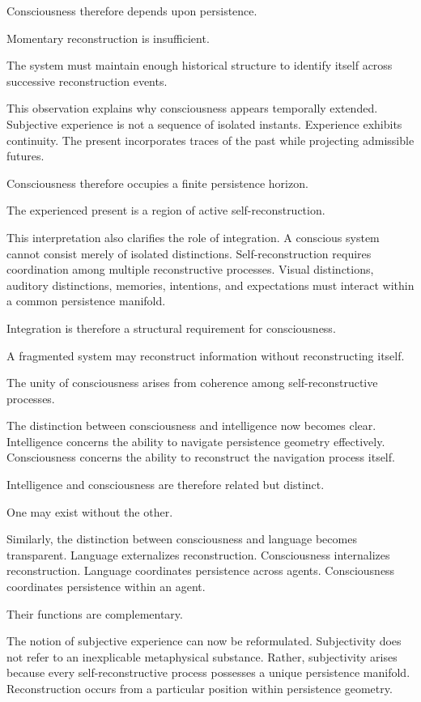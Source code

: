 \documentclass[12pt,oneside]{article}
\theoremstyle{definition}
\begin{document}
Consciousness therefore depends upon persistence.

Momentary reconstruction is insufficient.

The system must maintain enough historical structure to identify itself across successive reconstruction events.

This observation explains why consciousness appears temporally extended. Subjective experience is not a sequence of isolated instants. Experience exhibits continuity. The present incorporates traces of the past while projecting admissible futures.

Consciousness therefore occupies a finite persistence horizon.

The experienced present is a region of active self-reconstruction.

This interpretation also clarifies the role of integration. A conscious system cannot consist merely of isolated distinctions. Self-reconstruction requires coordination among multiple reconstructive processes. Visual distinctions, auditory distinctions, memories, intentions, and expectations must interact within a common persistence manifold.

Integration is therefore a structural requirement for consciousness.

A fragmented system may reconstruct information without reconstructing itself.

The unity of consciousness arises from coherence among self-reconstructive processes.

The distinction between consciousness and intelligence now becomes clear. Intelligence concerns the ability to navigate persistence geometry effectively. Consciousness concerns the ability to reconstruct the navigation process itself.

Intelligence and consciousness are therefore related but distinct.

One may exist without the other.

Similarly, the distinction between consciousness and language becomes transparent. Language externalizes reconstruction. Consciousness internalizes reconstruction. Language coordinates persistence across agents. Consciousness coordinates persistence within an agent.

Their functions are complementary.

The notion of subjective experience can now be reformulated. Subjectivity does not refer to an inexplicable metaphysical substance. Rather, subjectivity arises because every self-reconstructive process possesses a unique persistence manifold. Reconstruction occurs from a particular position within persistence geometry.
\end{document}
